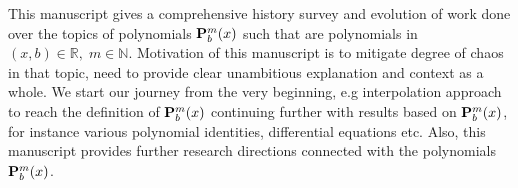 This manuscript gives a comprehensive history survey and evolution of work done over the topics of
polynomials ${\mathbf{P}}\sp{m} \sb{b}(x)$ such that are polynomials in $(x,b)\in\mathbb{R}, \; m\in\mathbb{N}$.
Motivation of this manuscript is to mitigate degree of chaos in that topic, need to provide clear unambitious explanation
and context as a whole.
We start our journey from the very beginning, e.g interpolation approach to reach the definition of ${\mathbf{P}}\sp{m} \sb{b}(x)$
continuing further with results based on ${\mathbf{P}}\sp{m} \sb{b}(x)$, for instance various polynomial identities, differential equations etc.
Also, this manuscript provides further research directions connected with the polynomials ${\mathbf{P}}\sp{m} \sb{b}(x)$.

